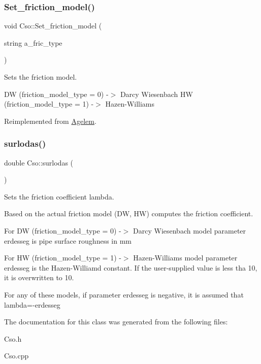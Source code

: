 \subsubsection{\texorpdfstring{Set\+\_\+friction\+\_\+model()}{Set\_friction\_model()}}
{\footnotesize\ttfamily void Cso\+::\+Set\+\_\+friction\+\_\+model (\begin{DoxyParamCaption}\item[{string}]{a\+\_\+fric\+\_\+type }\end{DoxyParamCaption})\hspace{0.3cm}{\ttfamily [virtual]}}



Sets the friction model. 

DW (friction\+\_\+model\+\_\+type = 0) -\/$>$ Darcy Wiesenbach HW (friction\+\_\+model\+\_\+type = 1) -\/$>$ Hazen-\/\+Williams 

Reimplemented from \hyperlink{class_agelem}{Agelem}.

\hypertarget{class_cso_a01d6ba01b924fe317638fe196a139d1f}{}\label{class_cso_a01d6ba01b924fe317638fe196a139d1f} 
\subsubsection{\texorpdfstring{surlodas()}{surlodas()}}
{\footnotesize\ttfamily double Cso\+::surlodas (\begin{DoxyParamCaption}{ }\end{DoxyParamCaption})}



Sets the friction coefficient lambda. 

Based on the actual friction model (DW, HW) computes the friction coefficient.

For DW (friction\+\_\+model\+\_\+type = 0) -\/$>$ Darcy Wiesenbach model parameter \textquotesingle{}erdesseg\textquotesingle{} is pipe surface roughness in mm

For HW (friction\+\_\+model\+\_\+type = 1) -\/$>$ Hazen-\/\+Williams model parameter \textquotesingle{}erdesseg\textquotesingle{} is the Hazen-\/\+Williamd constant. If the user-\/supplied value is less tha 10, it is overwritten to 10.

For any of these models, if parameter erdesseg is negative, it is assumed that lambda=-\/erdesseg 

The documentation for this class was generated from the following files\+:\begin{DoxyCompactItemize}
\item 
Cso.\+h\item 
Cso.\+cpp\end{DoxyCompactItemize}
